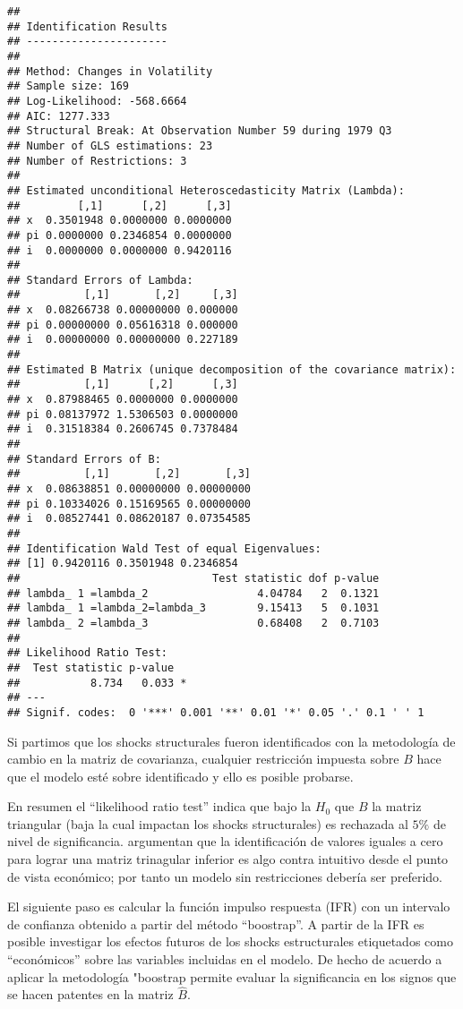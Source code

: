 \documentclass[
]{book}
\begin{document}
\begin{verbatim}
## 
## Identification Results
## ---------------------- 
## 
## Method: Changes in Volatility
## Sample size: 169
## Log-Likelihood: -568.6664
## AIC: 1277.333
## Structural Break: At Observation Number 59 during 1979 Q3
## Number of GLS estimations: 23
## Number of Restrictions: 3
## 
## Estimated unconditional Heteroscedasticity Matrix (Lambda):
##         [,1]      [,2]      [,3]
## x  0.3501948 0.0000000 0.0000000
## pi 0.0000000 0.2346854 0.0000000
## i  0.0000000 0.0000000 0.9420116
## 
## Standard Errors of Lambda:
##          [,1]       [,2]     [,3]
## x  0.08266738 0.00000000 0.000000
## pi 0.00000000 0.05616318 0.000000
## i  0.00000000 0.00000000 0.227189
## 
## Estimated B Matrix (unique decomposition of the covariance matrix): 
##          [,1]      [,2]      [,3]
## x  0.87988465 0.0000000 0.0000000
## pi 0.08137972 1.5306503 0.0000000
## i  0.31518384 0.2606745 0.7378484
## 
## Standard Errors of B:
##          [,1]       [,2]       [,3]
## x  0.08638851 0.00000000 0.00000000
## pi 0.10334026 0.15169565 0.00000000
## i  0.08527441 0.08620187 0.07354585
## 
## Identification Wald Test of equal Eigenvalues:
## [1] 0.9420116 0.3501948 0.2346854
##                              Test statistic dof p-value
## lambda_ 1 =lambda_2                 4.04784   2  0.1321
## lambda_ 1 =lambda_2=lambda_3        9.15413   5  0.1031
## lambda_ 2 =lambda_3                 0.68408   2  0.7103
## 
## Likelihood Ratio Test: 
##  Test statistic p-value  
##           8.734   0.033 *
## ---
## Signif. codes:  0 '***' 0.001 '**' 0.01 '*' 0.05 '.' 0.1 ' ' 1
\end{verbatim}

Si partimos que los shocks structurales fueron identificados con la metodología de cambio en la matriz de covarianza, cualquier restricción impuesta sobre \(B\) hace que el modelo esté sobre identificado y ello es posible probarse.

En resumen el ``likelihood ratio test'' indica que bajo la \(H_{0}\)
que \(B\) la matriz triangular (baja la cual impactan los shocks structurales) es rechazada al \(5\%\) de nivel de significancia. \citet{Herwartz2016} argumentan que la identificación de valores iguales a cero para lograr una matriz trinagular inferior es algo contra intuitivo desde el punto de vista económico; por tanto un modelo sin restricciones debería ser preferido.

El siguiente paso es calcular la función impulso respuesta (IFR) con un intervalo de confianza obtenido a partir del método ``boostrap''. A partir de la IFR es posible investigar los efectos futuros de los shocks estructurales etiquetados como ``económicos'' sobre las variables
incluidas en el modelo. De hecho de acuerdo a \citet{Herwartz18} aplicar la metodología "boostrap permite evaluar la significancia en los signos que se hacen patentes en la matriz \(\hat{B}\).
\end{document}
